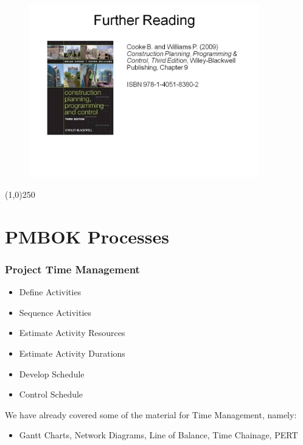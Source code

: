 \begin{frame}
\begin{figure}
	\centering
		\includegraphics[width = 10.0cm]{oldnotes/Slide317.jpg}
\end{figure}
\end{frame}
\begin{center}\line(1,0){250}\end{center}





\section{PMBOK Processes}


\begin{frame}
\frametitle{Project Time Management}
\begin{itemize}
	\item Define Activities
	\item Sequence Activities
	\item Estimate Activity Resources
	\item Estimate Activity Durations
	\item Develop Schedule
	\item Control Schedule
\end{itemize}

We have already covered some of the material for Time Management, namely:
\begin{itemize}
	\item Gantt Charts, Network Diagrams, Line of Balance, Time Chainage, PERT 
\end{itemize}

\end{frame}




